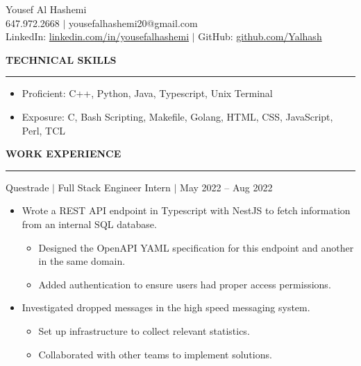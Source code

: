 \documentclass[12pt]{article}
\newcommand{\sectionRule}{\textcolor{gray}{\rule{7.27in}{0.02cm}}}
\newcommand{\sectionTxt}[1]{\noindent\textbf{#1}\\}
\newcommand{\textDate}[3]{\noindent#1 $|$ #2 $|$ {\color{textGray} #3}}
\begin{document}
    \begin{center}
        {\huge Yousef Al Hashemi}\\
        {\normalsize 647.972.2668 $|$ yousefalhashemi20@gmail.com}\\
        {\normalsize LinkedIn: \href{https://www.linkedin.com/in/yousefalhashemi}{linkedin.com/in/yousefalhashemi} $|$ GitHub: \href{https://github.com/Yalhash}{github.com/Yalhash}}\\
    \end{center}
    \sectionTxt{TECHNICAL SKILLS}
    \sectionRule
    \begin{small}
        \begin{itemize}
            \itemsep0em 
            \item Proficient: {\color{textGray}C++, Python, Java, Typescript, Unix Terminal}
            \item Exposure: {\color{textGray}C, Bash Scripting, Makefile, Golang, HTML, CSS, JavaScript, Perl, TCL}
        \end{itemize}
    \end{small}
    \sectionTxt{WORK EXPERIENCE}
    \sectionRule

    \textDate{Questrade}{Full Stack Engineer Intern}{May 2022 -- Aug 2022}
    \begin{small}
        \begin{itemize}
            \itemsep0em 
            \item {\color{textGray} Wrote a REST API endpoint in Typescript with NestJS to fetch information from an internal SQL database.}
                \begin{itemize}[label=$\circ$,topsep=-5px,partopsep=0px]
                    \itemsep0em 
                    \item {\color{textGray} Designed the OpenAPI YAML specification for this endpoint and another in the same domain.}
                    \item {\color{textGray} Added authentication to ensure users had proper access permissions.}
                \end{itemize}
            \item {\color{textGray} Investigated dropped messages in the high speed messaging system.}
                \begin{itemize}[label=$\circ$,topsep=-5px,partopsep=0px]
                    \itemsep0em 
                    \item {\color{textGray} Set up infrastructure to collect relevant statistics.}
                    \item {\color{textGray} Collaborated with other teams to implement solutions.}
                \end{itemize}
        \end{itemize}
    \end{small}
\end{document}
